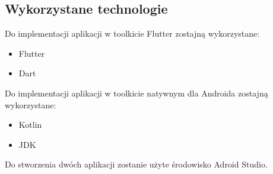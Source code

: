 \documentclass[12pt,a4paper]{article}
\begin{document}
\subsection{Wykorzystane technologie}
Do implementacji aplikacji w toolkicie Flutter zostajną wykorzystane:
\begin{itemize}
    \item Flutter
    \item Dart
\end{itemize}

Do implementacji aplikacji w toolkicie natywnym dla Androida zostajną wykorzystane:
\begin{itemize}
    \item Kotlin
    \item JDK
\end{itemize}

Do stworzenia dwóch aplikacji zostanie użyte środowisko Adroid Studio.
\end{document}
